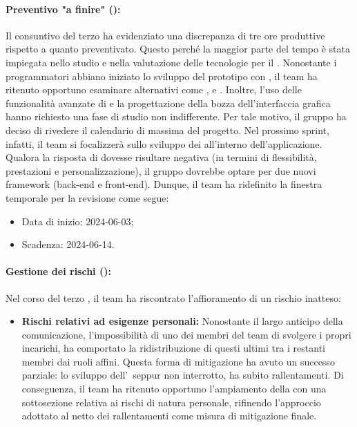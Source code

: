 \paragraph*{Preventivo "a finire" ():}
Il consuntivo del terzo  ha evidenziato una discrepanza di tre ore produttive rispetto a quanto preventivato. Questo perché la maggior parte del tempo è stata impiegata nello studio e nella valutazione delle tecnologie per il . Nonostante i programmatori abbiano iniziato lo sviluppo del prototipo con , il team ha ritenuto opportuno esaminare  alternativi come ,  e . Inoltre, l’uso delle funzionalità avanzate di  e la progettazione della bozza dell’interfaccia grafica hanno richiesto una fase di studio non indifferente. Per tale motivo, il gruppo ha deciso di rivedere il calendario di massima del progetto. Nel prossimo sprint, infatti, il team si focalizzerà sullo sviluppo dei  all’interno dell’applicazione. Qualora la risposta di  dovesse risultare negativa (in termini di flessibilità, prestazioni e personalizzazione), il gruppo dovrebbe optare per due nuovi framework (back-end e front-end). Dunque, il team ha ridefinito la finestra temporale per la revisione  come segue:
\begin{itemize}
  \item Data di inizio: 2024-06-03;
  \item Scadenza: 2024-06-14.
\end{itemize}

\paragraph*{Gestione dei rischi ():}
\par Nel corso del terzo , il team ha riscontrato l'affioramento di un rischio inatteso:
\begin{itemize}
  \item \textbf{Rischi relativi ad esigenze personali:} Nonostante il largo anticipo della comunicazione, l'impossibilità di uno dei membri del team di svolgere i propri incarichi, ha comportato la ridistribuzione di questi ultimi tra i restanti membri dai ruoli affini. 
  Questa forma di mitigazione ha avuto un successo parziale: lo sviluppo dell'\AdR\, seppur non interrotto, ha subito rallentamenti.
  Di conseguenza, il team ha ritenuto opportuno l'ampiamento della  con una sottosezione relativa ai rischi di natura personale, rifinendo l'approccio adottato al netto dei rallentamenti come misura di mitigazione finale.
\end{itemize}

